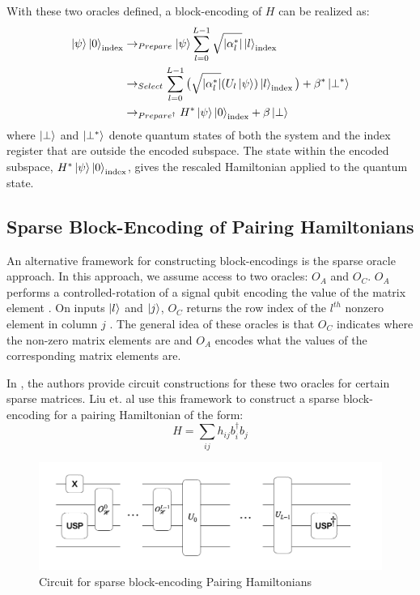 With these two oracles defined, a block-encoding of $H$ can be realized as:
\begin{equation}
    \begin{split}
        \ket{\psi} \ket{0}_{\text{index}} &\rightarrow_{Prepare} \ket{\psi} \sum_{l=0}^{L-1} \sqrt{| \alpha_l^* |} \ket{l}_{\text{index}} \\
        &\rightarrow_{Select} \sum_{l=0}^{L-1} \big(\sqrt{| \alpha_l^* |} (U_l \ket{\psi}) \ket{l}_{\text{index}} \big) + \beta^* \ket{\perp^*} \\
        &\rightarrow_{Prepare^\dagger}  H^* \ket{\psi} \ket{0}_{\text{index}} + \beta \ket{\perp} \\
    \end{split}
\end{equation}
where $\ket{\perp}$ and $\ket{\perp^*}$ denote quantum states of both the system and the index register that are outside the encoded subspace.
The state within the encoded subspace, $H^* \ket{\psi} \ket{0}_{\text{index}}$, gives the rescaled Hamiltonian applied to the quantum state.

\subsection{Sparse Block-Encoding of Pairing Hamiltonians}
\label{subsec:sparse-be}

An alternative framework for constructing block-encodings is the sparse oracle approach.
In this approach, we assume access to two oracles: $O_A$ and $O_C$.
$O_A$ performs a controlled-rotation of a signal qubit encoding the value of the matrix element .
On inputs $\ket{l}$ and $\ket{j}$, $O_C$ returns the row index of the $l^{th}$ nonzero element in column $j$ \cite{camps2024explicit}.
The general idea of these oracles is that $O_C$ indicates where the non-zero matrix elements are and $O_A$ encodes what the values of the corresponding matrix elements are. 

In \cite{camps2024explicit}, the authors provide circuit constructions for these two oracles for certain sparse matrices.
Liu et. al \cite{liu2024efficient} use this framework to construct a sparse block-encoding for a pairing Hamiltonian of the form:
\begin{equation}
    H = \sum_{ij}h_{ij}b^\dagger_i b_j
\end{equation}

\begin{figure}[h]
    \includegraphics[width = \linewidth]{figures/SBE.png}
    \caption{Circuit for sparse block-encoding Pairing Hamiltonians}
    \label{fig:sbe}
\end{figure}

